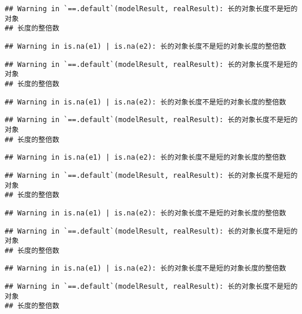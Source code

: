 \documentclass[]{article}
\begin{document}
\begin{verbatim}
## Warning in `==.default`(modelResult, realResult): 长的对象长度不是短的对象
## 长度的整倍数
\end{verbatim}

\begin{verbatim}
## Warning in is.na(e1) | is.na(e2): 长的对象长度不是短的对象长度的整倍数
\end{verbatim}

\begin{verbatim}
## Warning in `==.default`(modelResult, realResult): 长的对象长度不是短的对象
## 长度的整倍数
\end{verbatim}

\begin{verbatim}
## Warning in is.na(e1) | is.na(e2): 长的对象长度不是短的对象长度的整倍数
\end{verbatim}

\begin{verbatim}
## Warning in `==.default`(modelResult, realResult): 长的对象长度不是短的对象
## 长度的整倍数
\end{verbatim}

\begin{verbatim}
## Warning in is.na(e1) | is.na(e2): 长的对象长度不是短的对象长度的整倍数
\end{verbatim}

\begin{verbatim}
## Warning in `==.default`(modelResult, realResult): 长的对象长度不是短的对象
## 长度的整倍数
\end{verbatim}

\begin{verbatim}
## Warning in is.na(e1) | is.na(e2): 长的对象长度不是短的对象长度的整倍数
\end{verbatim}

\begin{verbatim}
## Warning in `==.default`(modelResult, realResult): 长的对象长度不是短的对象
## 长度的整倍数
\end{verbatim}

\begin{verbatim}
## Warning in is.na(e1) | is.na(e2): 长的对象长度不是短的对象长度的整倍数
\end{verbatim}

\begin{verbatim}
## Warning in `==.default`(modelResult, realResult): 长的对象长度不是短的对象
## 长度的整倍数
\end{verbatim}
\end{document}
